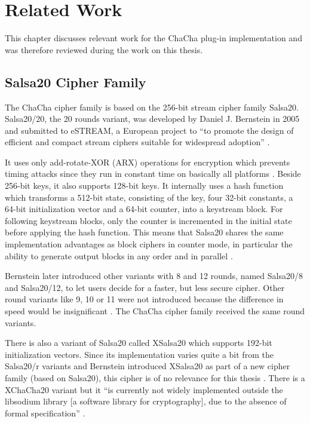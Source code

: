 
\chapter{Related Work}
\label{sec:relatedWork}

This chapter discusses relevant work for the ChaCha plug-in implementation and was therefore reviewed during the work on this thesis.

\section{Salsa20 Cipher Family}
\label{sec:salsaCipher}

The ChaCha cipher family is based on the 256-bit stream cipher family Salsa20.
\noindent
Salsa20/20, the 20 rounds variant, was developed by Daniel J. Bernstein in 2005 \cite{salsaspec} and submitted to eSTREAM, a European project to ``to promote the design of efficient and compact stream ciphers suitable for widespread adoption'' \cite{estream}.

It uses only add-rotate-XOR (ARX) operations for encryption which prevents timing attacks since they run in constant time on basically all platforms \cite{salsasec}. Beside 256-bit keys, it also supports 128-bit keys. It internally uses a hash function which transforms a 512-bit state, consisting of the key, four 32-bit constants, a 64-bit initialization vector and a 64-bit counter, into a keystream block. For following keystream blocks, only the counter is incremented in the initial state before applying the hash function. This means that Salsa20 shares the same implementation advantages as block ciphers in counter mode, in particular the ability to generate output blocks in any order and in parallel \cite{salsaspec}.

Bernstein later introduced other variants with 8 and 12 rounds, named Salsa20/8 and Salsa20/12, to let users decide for a faster, but less secure cipher. Other round variants like 9, 10 or 11 were not introduced because the difference in speed would be insignificant \cite{salsa812}. The ChaCha cipher family received the same round variants. 

There is also a variant of Salsa20 called XSalsa20 which supports 192-bit initialization vectors. Since its implementation varies quite a bit from the Salsa20/r variants and Bernstein introduced XSalsa20 as part of a new cipher family (based on Salsa20), this cipher is of no relevance for this thesis \cite{xsalsa20spec}. There is a XChaCha20 variant but it ``is currently not widely implemented outside the libsodium library [a software library for cryptography], due to the absence of formal specification'' \cite{xchacha20}.

